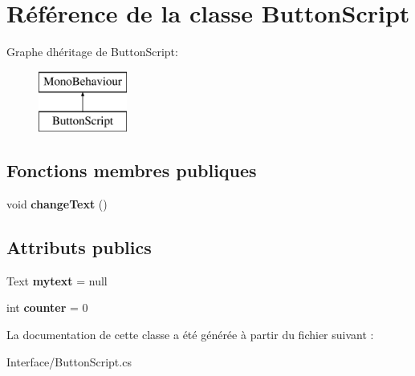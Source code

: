 \hypertarget{class_button_script}{}\section{Référence de la classe Button\+Script}
\label{class_button_script}
Graphe d\textquotesingle{}héritage de Button\+Script\+:\begin{figure}[H]
\begin{center}
\leavevmode
\includegraphics[height=2.000000cm]{class_button_script}
\end{center}
\end{figure}
\subsection*{Fonctions membres publiques}
\begin{DoxyCompactItemize}
\item 
\mbox{\label{class_button_script_ab6ae2731d924263b61652a6d9e0969e2}} 
void {\bfseries change\+Text} ()
\end{DoxyCompactItemize}
\subsection*{Attributs publics}
\begin{DoxyCompactItemize}
\item 
\mbox{\label{class_button_script_ab706f85e9e0c98764c3a1e4b113dc3f1}} 
Text {\bfseries mytext} = null
\item 
\mbox{\label{class_button_script_a1f6ec0cc79a94c93661780668ac8c173}} 
int {\bfseries counter} = 0
\end{DoxyCompactItemize}


La documentation de cette classe a été générée à partir du fichier suivant \+:\begin{DoxyCompactItemize}
\item 
Interface/Button\+Script.\+cs\end{DoxyCompactItemize}
